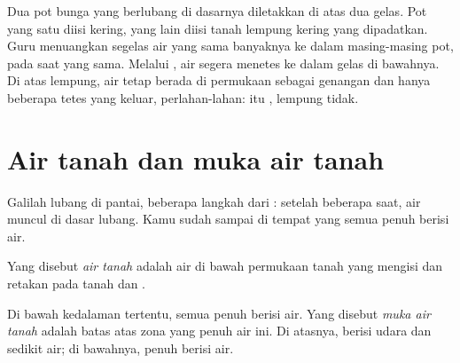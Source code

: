 \begin{inthelab}
Dua pot bunga yang berlubang di dasarnya diletakkan di atas dua gelas. Pot
yang satu diisi  kering, yang lain diisi tanah lempung kering yang
dipadatkan. Guru menuangkan segelas air yang sama banyaknya ke dalam
masing-masing pot, pada saat yang sama. Melalui , air segera menetes ke
dalam gelas di bawahnya. Di atas lempung, air tetap berada di permukaan
sebagai genangan dan hanya beberapa tetes yang keluar, perlahan-lahan: 
itu , lempung tidak.
\end{inthelab}

\section{Air tanah dan muka air tanah}

Galilah lubang di  pantai, beberapa langkah dari : setelah
beberapa saat, air muncul di dasar lubang. Kamu sudah sampai di tempat yang
semua   penuh berisi air.

\begin{definition}\label{def:g6:water-underground:groundwater}
Yang disebut \emph{air tanah} adalah air di bawah permukaan
tanah yang mengisi  dan retakan pada tanah dan .
\end{definition}

\begin{definition}\label{def:g6:water-underground:water-table}
Di bawah kedalaman tertentu, semua   penuh berisi air. Yang disebut
\emph{muka air tanah} adalah batas atas zona yang
penuh air ini. Di atasnya,  berisi udara dan sedikit air; di
bawahnya,  penuh berisi air.
\end{definition}

